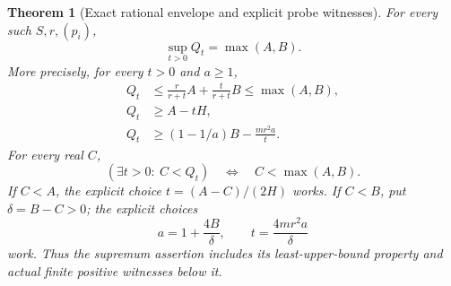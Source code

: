 \documentclass[11pt]{article}
\newtheorem{theorem}{Theorem}[section]
\theoremstyle{definition}
\begin{document}
\begin{theorem}[Exact rational envelope and explicit probe witnesses]
For every such $S,r,(p_i)$,
\[
 \sup_{t>0}Q_t=\max(A,B).
\]
More precisely, for every $t>0$ and $a\ge1$,
\[
 \begin{split}
 Q_t&\le\frac{r}{r+t}A+\frac{t}{r+t}B
          \le\max(A,B),\\
 Q_t&\ge A-tH,\\
 Q_t&\ge (1-1/a)B-\frac{mr^2a}{t}.
 \end{split}
\]
For every real $C$,
\[
 (\exists t>0:\ C<Q_t)\quad\Longleftrightarrow\quad C<\max(A,B).
\]
If $C<A$, the explicit choice $t=(A-C)/(2H)$ works.
If $C<B$, put $\delta=B-C>0$; the explicit choices
\[
 a=1+\frac{4B}{\delta},\qquad
 t=\frac{4mr^2a}{\delta}
\]
work. Thus the supremum assertion includes its least-upper-bound
property and actual finite positive witnesses below it.
\end{theorem}
\end{document}
